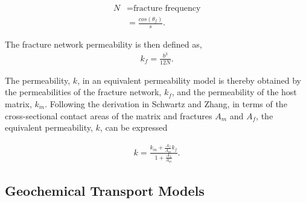 \begin{align}
  N &= \mbox{fracture frequency}\nonumber\\
  &= \frac{cos(\theta_f)}{s}.
  \label{fracfreq}
\end{align}

The fracture network permeability is then defined as,
\begin{align}
  k_f = \frac{b^3}{12N}.
  \label{fracperm}
\end{align}

The permeability, $k$, in an equivalent permeability model is thereby 
obtained
by the permeabilities of the fracture network, $k_f$, and the 
permeability
of the host matrix, $k_m$. Following the derivation in Schwartz and 
Zhang, in terms of the cross-sectional contact areas of the matrix and 
fractures $A_m$ and $A_f$, the equivalent permeability, $k$, can be 
expressed

\begin{align}
  k = \frac{k_m + \frac{A_f}{A_m}k_f}{1+\frac{A_f}{A_m}}.
  \label{equivperm}
\end{align}

\subsection{Geochemical Transport Models}








